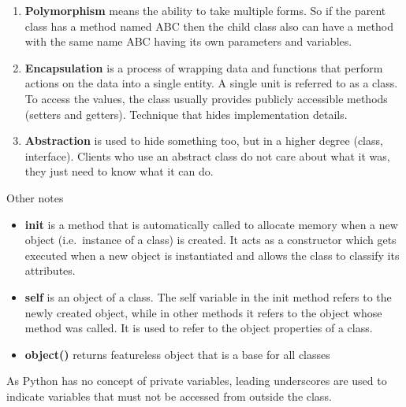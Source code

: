 \documentclass[
  letterpaper,
  DIV=11,
  numbers=noendperiod]{scrreprt}
\providecommand{\tightlist}{%
  \setlength{\itemsep}{0pt}\setlength{\parskip}{0pt}}\usepackage{longtable,booktabs,array}
\begin{document}
\begin{enumerate}
\def\labelenumi{\alph{enumi})}
\setcounter{enumi}{1}
\tightlist
\item
  \textbf{Polymorphism} means the ability to take multiple forms. So if
  the parent class has a method named ABC then the child class also can
  have a method with the same name ABC having its own parameters and
  variables.
\item
  \textbf{Encapsulation} is a process of wrapping data and functions
  that perform actions on the data into a single entity. A single unit
  is referred to as a class. To access the values, the class usually
  provides publicly accessible methods (setters and getters). Technique
  that hides implementation details.
\item
  \textbf{Abstraction} is used to hide something too, but in a higher
  degree (class, interface). Clients who use an abstract class do not
  care about what it was, they just need to know what it can do.
\end{enumerate}

Other notes

\begin{itemize}
\tightlist
\item
  \textbf{\textbf{init}} is a method that is automatically called to
  allocate memory when a new object (i.e.~instance of a class) is
  created. It acts as a constructor which gets executed when a new
  object is instantiated and allows the class to classify its
  attributes.
\item
  \textbf{self} is an object of a class. The self variable in the init
  method refers to the newly created object, while in other methods it
  refers to the object whose method was called. It is used to refer to
  the object properties of a class.
\item
  \textbf{object()} returns featureless object that is a base for all
  classes
\end{itemize}

\begin{tcolorbox}[enhanced jigsaw, opacitybacktitle=0.6, colback=white, bottomrule=.15mm, coltitle=black, opacityback=0, breakable, rightrule=.15mm, colframe=quarto-callout-note-color-frame, arc=.35mm, titlerule=0mm, colbacktitle=quarto-callout-note-color!10!white, toptitle=1mm, bottomtitle=1mm, leftrule=.75mm, toprule=.15mm, title=\textcolor{quarto-callout-note-color}{\faInfo}\hspace{0.5em}{Note}, left=2mm]

As Python has no concept of private variables, leading underscores are
used to indicate variables that must not be accessed from outside the
class.

\end{tcolorbox}
\end{document}
